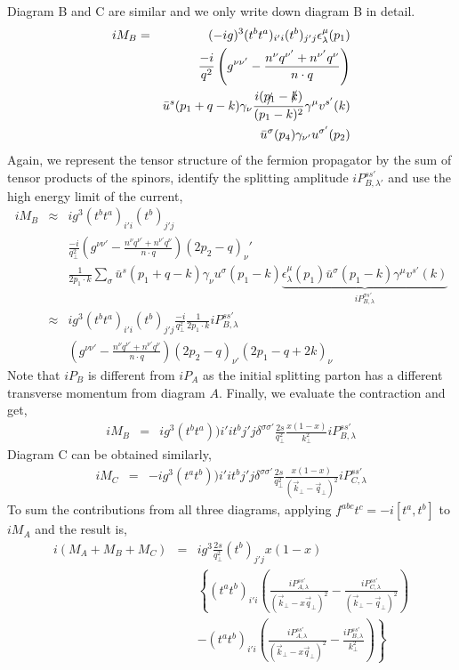 \begin{appendices}
Diagram B and C are similar and we only write down diagram B in detail.
\begin{eqnarray}
i M_B &=& (-ig)^3 (t^bt^a)_{i'i}(t^b)_{j'j} \epsilon_\lambda^\mu(p_1) \\\nonumber
&&\frac{-i}{q^2}\left(g^{\nu\nu'}-\frac{n^{\nu}q^{\nu'}+n^{\nu'}q^\nu}{n\cdot q}\right) \\\nonumber
&&\bar{u}^s(p_1+q-k)\gamma_{\nu}\frac{i(\slashed{p_1}-\slashed{k})}{(p_1-k)^2}\gamma^{\mu}v^{s'}(k) \\ \nonumber
&&\bar{u}^{\sigma}(p_4)\gamma_{\nu'}u^{\sigma'}(p_2)
\end{eqnarray}
Again, we represent the tensor structure of the fermion propagator by the sum of tensor products of the spinors, identify the splitting amplitude $iP_{B,\lambda'}^{ss'}$ and use the high energy limit of the current,
\begin{eqnarray}
i M_B &\approx& ig^3 (t^bt^a)_{i'i}(t^b)_{j'j}  \\\nonumber
&&\frac{-i}{q_\perp^2}\left(g^{\nu\nu'}-\frac{n^{\nu}q^{\nu'}+n^{\nu'}q^\nu}{n\cdot q}\right) (2p_2-q)_\nu' \\\nonumber
&&\frac{1}{2p_1\cdot k} \sum_\sigma \bar{u}^s(p_1+q-k)\gamma_{\nu} u^{\sigma}(p_1-k) \underbrace{\epsilon_\lambda^\mu(p_1)\bar{u}^{\sigma}(p_1-k) \gamma^{\mu}v^{s'}(k)}_{iP_{B,\lambda}^{\sigma s'}}\\
&\approx& ig^3 (t^bt^a)_{i'i}(t^b)_{j'j} \frac{-i}{q_\perp^2}\frac{1}{2p_1\cdot k} iP_{B,\lambda}^{ss'}\\\nonumber
&&\left(g^{\nu\nu'}-\frac{n^{\nu}q^{\nu'}+n^{\nu'}q^\nu}{n\cdot q}\right) (2p_2-q)_{\nu'} (2p_1-q+2k)_\nu 
\end{eqnarray}
Note that $iP_{B}$ is different from $iP_{A}$ as the initial splitting parton has a different transverse momentum from diagram $A$.
Finally, we evaluate the contraction and get,
\begin{eqnarray}
i M_B &=& i g^3 (t^b t^a)){i'i} t^b{j'j} \delta^{\sigma\sigma'} \frac{2s}{q_\perp^2} \frac{x(1-x)}{k_\perp^2}  iP_{B,\lambda}^{ss'}
\end{eqnarray}
Diagram C can be obtained similarly,
\begin{eqnarray}
i M_C &=& -i g^3 (t^a t^b)){i'i} t^b{j'j} \delta^{\sigma\sigma'} \frac{2s}{q_\perp^2} \frac{x(1-x)}{(\vec{k}_\perp-\vec{q}_\perp)^2}  iP_{C,\lambda}^{ss'} 
\end{eqnarray}
To sum the contributions from all three diagrams, applying $f^{abc}t^c = -i[t^a, t^b]$ to $iM_A$ and the result is,
\begin{eqnarray}
i (M_A+M_B+M_C) &=& ig^3 \frac{2s}{q_\perp^2} (t^b)_{j'j} x(1-x)\\\nonumber
&&\left\{(t^a t^b)_{i'i} \left(\frac{iP_{A,\lambda}^{ss'} }{(\vec{k}_\perp-x \vec{q}_\perp)^2} - \frac{iP_{C,\lambda}^{ss'}}{(\vec{k}_\perp-\vec{q}_\perp)^2}\right) \right. \\\nonumber
&&\left.-(t^a t^b)_{i'i}\left(\frac{iP_{A,\lambda}^{ss'} }{(\vec{k}_\perp-x \vec{q}_\perp)^2} - \frac{iP_{B,\lambda}^{ss'}}{k_\perp^2}\right) \right\}
\end{eqnarray}


\end{appendices}
